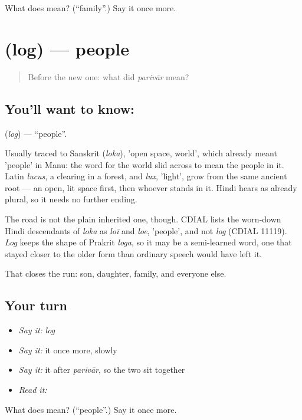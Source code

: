 \begin{tcolorbox}[breakable,colback=teal!4,colframe=teal!35!black,title={Before you move on}]
What does  mean? (\textquotedblleft{}family\textquotedblright{}.) Say it once more.
\end{tcolorbox}
\section[\texorpdfstring{\hi{लोग} (log)}{लोग (log)}]{ (log) — people}

\label{lesson:HI-C44-people}



\begin{quote}
Before the new one: what did \emph{parivār} mean?
\end{quote}

\subsection*{You'll want to know: }
\textbf{} (\emph{log}) — \textquotedblleft{}people\textquotedblright{}.

Usually traced to Sanskrit  (\emph{loka}), 'open space, world', which already meant 'people' in Manu: the word for the world slid across to mean the people in it. Latin \emph{lucus}, a clearing in a forest, and \emph{lux}, 'light', grow from the same ancient root — an open, lit space first, then whoever stands in it. Hindi hears  as already plural, so it needs no further ending.

The road is not the plain inherited one, though. CDIAL lists the worn-down Hindi descendants of \emph{loka} as \emph{loī} and \emph{loe}, 'people', and not \emph{log} (CDIAL 11119). \emph{Log} keeps the shape of Prakrit \emph{loga}, so it may be a semi-learned word, one that stayed closer to the older form than ordinary speech would have left it.

\begin{grammarlens}[title={What you've built}]
That closes the run: son, daughter, family, and everyone else.
\end{grammarlens}

\subsection*{Your turn}
\begin{itemize}
\raggedright
  \item \emph{Say it:} \emph{log}
  \item \emph{Say it:} it once more, slowly
  \item \emph{Say it:} it after \emph{parivār}, so the two sit together
  \item \emph{Read it:} \textbf{}
\end{itemize}

\begin{tcolorbox}[breakable,colback=teal!4,colframe=teal!35!black,title={Before you move on}]
What does  mean? (\textquotedblleft{}people\textquotedblright{}.) Say it once more.
\end{tcolorbox}
